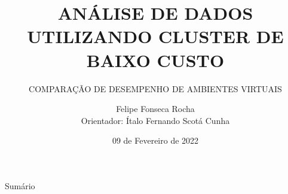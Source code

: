 \documentclass[10pt,brazil]{beamer}
\theoremstyle{definition}
\begin{document}

\title[]{ANÁLISE DE DADOS UTILIZANDO CLUSTER DE BAIXO CUSTO}
\subtitle{COMPARAÇÃO DE DESEMPENHO DE AMBIENTES VIRTUAIS}


\author[Felipe Rocha]{Felipe Fonseca Rocha \\
  \vspace{0.25cm}
  Orientador: Ítalo Fernando Scotá Cunha}
\date{09 de Fevereiro de 2022}

\AtBeginSubsection{%
  \begin{frame}
    \tableofcontents[currentsection,sectionstyle=show/shaded,subsectionstyle=show/hide/hide]
  \end{frame}
}
\frame{\maketitle}


\begin{frame}{Sumário}
  \tableofcontents[hideallsubsections]
\end{frame}


%
%

\end{document}
